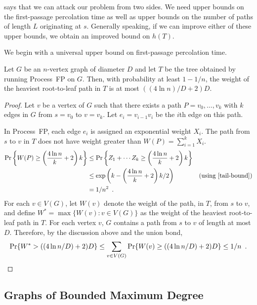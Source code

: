 \documentclass{patmorin}
\begin{document}
 says that we can attack our problem from two
sides. We need upper bounds on the first-passage percolation time as well
as upper bounds on the number of paths of length $L$ originating at $s$.
Generally speaking, if we can improve either of these upper bounds,
we obtain an improved bound on $h(T)$.

We begin with a universal upper bound on first-passage percolation time.

\begin{lem}
  Let $G$ be an $n$-vertex graph of diameter $D$ and let $T$ be the
  tree obtained by running Process~FP on $G$.  Then, with probability
  at least $1-1/n$, the weight of the heaviest root-to-leaf path in $T$
  is at most $((4\ln n)/D+2)D$.
\end{lem}

\begin{proof}
  Let $v$ be a vertex of $G$ such that there exists a path
  $P=v_0,\ldots,v_k$ with $k$ edges in $G$ from $s=v_0$ to $v=v_k$.
  Let $e_i=v_{i-1}v_i$ be the $i$th edge on this path.

  In Process~FP, each edge $e_i$ is assigned an exponential weight $X_i$.
  The path from $s$ to $v$ in $T$ does not have weight greater than
  $W(P)=\sum_{i=1}^k X_i$.
  \begin{align*}
      \Pr\left\{W(P)\ge \left(\frac{4\ln n}{k}+2\right)k\right\} 
        & \le \Pr\left\{Z_1+\cdots Z_k\ge \left(\frac{4\ln n}{k}+2\right)k\right\} \\ 
        & \le \exp\left(k - \left(\frac{4\ln n}{k}+2\right)k/2\right) 
            & \text{(using \eqref{tail-bound})} \\
      & = 1/n^2 \enspace .
  \end{align*}
  For each $v\in V(G)$, let $W(v)$ denote the weight of the path, in
  $T$, from $s$ to $v$, and define $W^*=\max\{W(v):v\in V(G)\}$  as the
  weight of the heaviest root-to-leaf path in $T$.  For each vertex $v$,
  $G$ contains a path from $s$ to $v$ of length at most $D$. Therefore,
  by the discussion above and the union bond,
  \[
      \Pr\{W^*> ((4\ln n/D)+2)D\} 
          \le \sum_{v\in V(G)}\Pr\{W(v) \ge ((4\ln n/D)+2)D\}     
       \le 1/n \enspace . \qedhere
  \]
\end{proof}

\subsection{Graphs of Bounded Maximum Degree}
\end{document}
